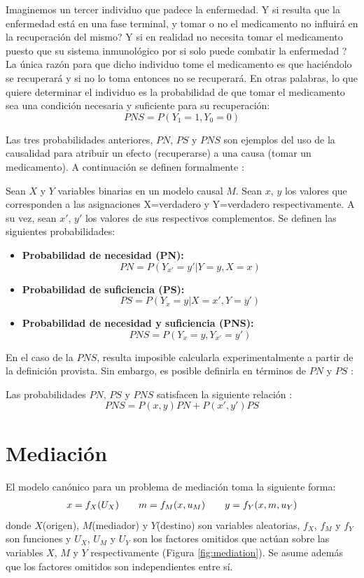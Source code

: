 Imaginemos un tercer individuo que padece la enfermedad. \textquestiondown Y si resulta que la enfermedad está en una fase terminal, y tomar o no el medicamento no influirá en la recuperación del mismo? \textquestiondown Y si en realidad no necesita tomar el medicamento puesto que su sistema inmunológico por si solo puede combatir la enfermedad ? La única razón para que dicho individuo tome el medicamento es que haciéndolo se recuperará y si no lo toma entonces no se recuperará. En otras palabras, lo que quiere determinar el individuo es la probabilidad de que tomar el medicamento sea una condición necesaria y suficiente para su recuperación:
\[ PNS = P(Y_1=1, Y_0=0) \]		

Las tres probabilidades anteriores, $PN$, $PS$ y $PNS$ son ejemplos del uso de la causalidad para atribuir un efecto (recuperarse) a una causa (tomar un medicamento). A continuación se definen formalmente \cite{pearl2016causal}:

\begin{dfn}
	Sean $X$ y $Y$ variables binarias en un modelo causal $M$. Sean $x$, $y$ los valores que corresponden a las asignaciones X=verdadero y Y=verdadero respectivamente. A su vez, sean $x'$, $y'$ los valores de sus respectivos complementos. Se definen las siguientes probabilidades:			
	\begin{itemize}
		\item \textbf{Probabilidad de necesidad (PN):}
		\[PN=P(Y_{x'}=y'|Y=y,X=x)\]
		\item \textbf{Probabilidad de suficiencia (PS):}
		\[PS = P(Y_x=y|X=x',Y=y')\]
		\item \textbf{Probabilidad de necesidad y suficiencia (PNS):}
		\[ PNS = P(Y_x=y, Y_{x'}=y') \]
	\end{itemize}			
\end{dfn}

En el caso de la $PNS$, resulta imposible calcularla experimentalmente a partir de la definición provista. Sin embargo, es posible definirla en términos de $PN$ y $PS$ \cite{pearl_2009}: 

\begin{prop}
	Las probabilidades $PN$, $PS$ y $PNS$ satisfacen la siguiente relación :
	\[ PNS = P(x,y)PN + P(x',y')PS \]
\end{prop}

\section{Mediación}\label{sec:med}
El modelo canónico para un problema de mediación toma la siguiente forma:
\[
\arraycolsep=10pt
\begin{array}{ccc}
	x = f_X(U_X)&
	m = f_M(x, u_M)&
	y = f_Y(x, m , u_Y)
\end{array}
\]
donde $X$(origen), $M$(mediador) y $Y$(destino) son variables aleatorias, $f_X$, $f_M$ y $f_Y$ son funciones y $U_X$, $U_M$ y $U_Y$ son los factores omitidos que actúan sobre las variables $X$, $M$ y $Y$ respectivamente (Figura \ref{fig:mediation}). Se asume además que los factores omitidos son independientes entre sí.

